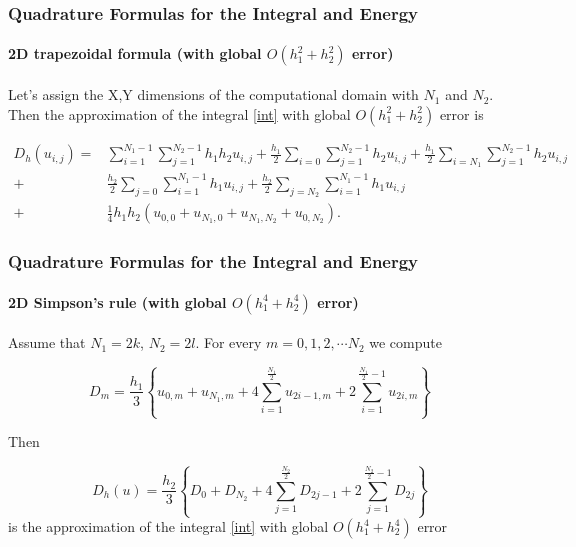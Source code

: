 \documentclass{beamer}
\begin{document}

\begin{frame}
\frametitle{Quadrature Formulas for the Integral and Energy}
\framesubtitle{\textbf{2D trapezoidal formula} (with global $O(h_1^2+h_2^2)$ error)}

Let's assign the X,Y dimensions of the computational domain with $N_1$ and $N_2$.
Then the approximation of the integral \eqref{int} with global $O(h_1^2+h_2^2)$ error is

\begin{align}\label{quadr2}
D_h(u_{i,j}) =& \sum_{i=1}^{N_1-1} \sum_{j=1}^{N_2-1} h_1 h_2 u_{i,j}
+\frac{h_1}{2}\sum_{i=0} \sum_{j=1}^{N_2-1} h_2 u_{i,j}
+\frac{h_1}{2}\sum_{i=N_1} \sum_{j=1}^{N_2-1} h_2 u_{i,j} \nonumber\\
+&\frac{h_2}{2}\sum_{j=0} \sum_{i=1}^{N_1-1} h_1 u_{i,j}
+\frac{h_2}{2}\sum_{j=N_2} \sum_{i=1}^{N_1-1} h_1 u_{i,j}
\nonumber\\
+&\frac{1}{4}h_1 h_2 \left(u_{0,0}+u_{N_1,0}+u_{N_1,N_2}+u_{0,N_2}
\right).
\end{align}

\end{frame}

\begin{frame}
\frametitle{Quadrature Formulas for the Integral and Energy}
\framesubtitle{\textbf{2D Simpson's rule} (with global $O(h_1^4+h_2^4)$ error)}
Assume that $N_1=2k$, $N_2=2 l$.
For every $m=0,1,2,\cdots N_2$ we compute 

$$D_m= \frac{h_1 }{3} 
\left\{ u_{0,m}+u_{N_1,m}+ 4 \sum_{i=1}^{\frac{N_1}{2}}   u_{2i-1,m}
 +2 \sum_{i=1}^{\frac{N_1}{2}-1} u_{2i,m} \right\}$$


Then 

\begin{equation}\label{quadr4}
D_h(u)=\frac{h_2 }{3} 
\left\{ D_{0}+D_{N_2}+ 4 \sum_{j=1}^{\frac{N_2}{2}}   D_{2j-1}
 +2 \sum_{j=1}^{{\frac{N_2}{2}}-1} D_{2j} \right\}
\end{equation}
is the approximation of the integral \eqref{int} with global $O(h_1^4+h_2^4)$ error

\end{frame}

\end{document}

